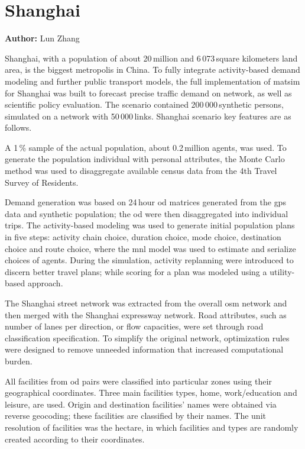 \chapter{Shanghai}
\label{ch:shanghai}
\hfill \textbf{Author:} Lun Zhang


Shanghai, with a population of about 20\,million and 6\,073\,square kilometers land area, is the biggest metropolis in China. To fully integrate activity-based demand modeling and further public transport models, the full implementation of \gls{matsim} for Shanghai was built to forecast precise traffic demand on network, as well as scientific policy evaluation. The scenario contained 200\,000\,synthetic persons, simulated on a network with 50\,000\,links. Shanghai scenario key features are as follows.

A 1\,\% sample of the actual population, about 0.2\,million agents, was used. To generate the population individual with personal attributes, the Monte Carlo method was used to disaggregate available census data from the 4th Travel Survey of Residents.

Demand generation was based on 24\,hour \gls{od} matrices generated from the \gls{gps} data and synthetic population; the \gls{od} were then disaggregated into individual trips. The activity-based modeling was used to generate initial population plans in five steps: activity chain choice, duration choice, mode choice, destination choice and route choice, where the \gls{mnl} model was used to estimate and serialize choices of agents. During the simulation, activity \gls{replanning} were introduced to discern better travel plans; while scoring for a plan was modeled using a utility-based approach.

The Shanghai street network was extracted from the overall \gls{osm} network and then merged with the Shanghai expressway network. Road attributes, such as  number of lanes per direction, or  flow capacities, were set through road classification specification. To simplify the original network, optimization rules were designed to remove unneeded information that increased computational burden.

All facilities from \gls{od} pairs were classified into particular zones using their geographical coordinates. Three main facilities types, home, work/education and leisure, are used. Origin and destination facilities' names were obtained via reverse \gls{geocoding}; these facilities are classified by their names. The unit resolution of facilities was the hectare, in which facilities and types are randomly created according to their coordinates.

